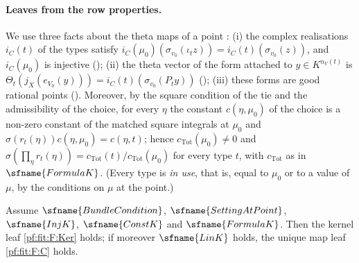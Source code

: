 \paragraph{Leaves from the row properties.}
We use three facts about the theta maps of a point \cite{LeanSource2026}: (i) the complex realisations $i_C(t)$ of the types
satisfy $i_C(\mu_0)(\sigma_{v_0}(\iota_tz))=i_C(t)(\sigma_{v_0}(z))$, and $i_C(\mu_0)$ is injective
(); (ii) the theta vector of the form attached to $y\in K^{n_V(t)}$ is
$\Theta_t(j_X(e_{V_0}(y)))=i_C(t)(\sigma_{v_0}(P_ty))$ (); (iii) these forms are
good rational points (). Moreover, by the square condition of the tie and the
admissibility of the choice, for every $\eta$ the constant $c(\eta,\mu_0)$ of the choice is a non-zero constant of the
matched square integrals at $\mu_0$ and $\sigma(r_t(\eta))c(\eta,\mu_0)=c(\eta,t)$; hence
$c_{\mathrm{Tot}}(\mu_0)\ne0$ and $\sigma(\prod_\eta r_t(\eta))=c_{\mathrm{Tot}}(t)/c_{\mathrm{Tot}}(\mu_0)$ for every type $t$,
with $c_{\mathrm{Tot}}$ as in $\sfname{FormulaK}$. (Every type is \emph{in use}, that is, equal to $\mu_0$ or to a value of
$\mu$, by the conditions on $\mu$ at the point.)

\begin{lemma}\label{pf:fit:leafrow}
Assume $\sfname{BundleCondition}$, $\sfname{SettingAtPoint}$, $\sfname{InjK}$, $\sfname{ConstK}$ and $\sfname{FormulaK}$.
Then the kernel leaf \ref{pf:fit:F:Ker} holds; if moreover $\sfname{LinK}$ holds, the unique map leaf \ref{pf:fit:F:C} holds.
\end{lemma}

